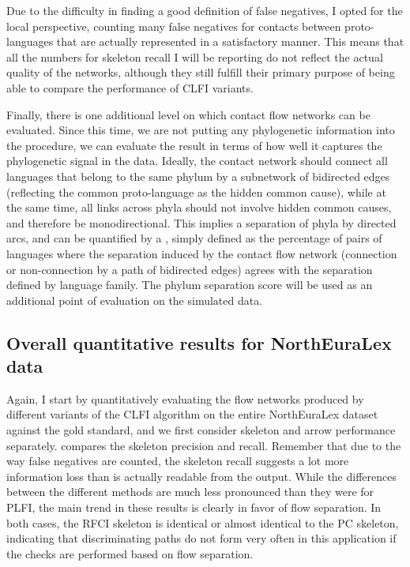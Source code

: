 Due to the difficulty in finding a good definition of false negatives, I opted for the local perspective, counting many false negatives for contacts between proto-languages that are actually represented in a satisfactory manner. This means that all the numbers for skeleton recall I will be reporting do not reflect the actual quality of the networks, although they still fulfill their primary purpose of being able to compare the performance of CLFI variants.

\newpage 
Finally, there is one additional level on which contact flow networks can be evaluated. Since this time, we are not putting any phylogenetic information into the procedure, we can evaluate the result in terms of how well it captures the phylogenetic signal in the data. Ideally, the contact network should connect all languages that belong to the same phylum by a subnetwork of bidirected edges (reflecting the common proto-language as the hidden common cause), while at the same time, all links across phyla should not involve hidden common causes, and therefore be monodirectional. This implies a separation of phyla by directed arcs, and can be quantified by a \textit{}, simply defined as the percentage of pairs of languages where the separation induced by the contact flow network (connection or non-connection by a path of bidirected edges) agrees with the separation defined by language family. The phylum separation score will be used as an additional point of evaluation on the 
simulated data.

\subsection{Overall quantitative results for NorthEuraLex data}
Again, I start by quantitatively evaluating the flow networks produced by different variants of the CLFI algorithm on the entire NorthEuraLex dataset against the gold standard, and we first consider skeleton and arrow performance separately.  compares the skeleton precision and recall. Remember that due to the way false negatives are counted, the skeleton recall suggests a lot more information loss than is actually readable from the output. While the differences between the different methods are much less pronounced than they were for PLFI, the main trend in these results is clearly in favor of flow separation. In both cases, the RFCI skeleton is identical or almost identical to the PC skeleton, indicating that discriminating paths do not form very often in this application if the checks are performed based on flow separation.

